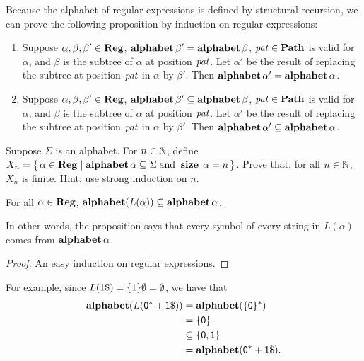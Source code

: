 Because the alphabet of regular expressions is defined by structural
recursion, we can prove the following proposition by induction
on regular expressions:
\begin{proposition}
\label{RegAlphabetSubtreeSubstitute}
\begin{enumerate}[\quad(1)]
\item Suppose $\alpha,\beta,\beta'\in\mathbf{Reg}$,
  $\mathbf{alphabet}\,\beta' = \mathbf{alphabet}\,\beta$, ${\it pat}\in\mathbf{Path}$ is valid for
  $\alpha$, and $\beta$ is the subtree of $\alpha$ at position ${\it pat}$.
  Let $\alpha'$ be the result of replacing the subtree at position
  ${\it pat}$ in $\alpha$ by $\beta'$. Then
  $\mathbf{alphabet}\,\alpha' = \mathbf{alphabet}\,\alpha$.

\item Suppose $\alpha,\beta,\beta'\in\mathbf{Reg}$,
  $\mathbf{alphabet}\,\beta' \subseteq \mathbf{alphabet}\,\beta$, ${\it pat}\in\mathbf{Path}$ is valid for
  $\alpha$, and $\beta$ is the subtree of $\alpha$ at position ${\it pat}$.
  Let $\alpha'$ be the result of replacing the subtree at position
  ${\it pat}$ in $\alpha$ by $\beta'$. Then
  $\mathbf{alphabet}\,\alpha' \subseteq \mathbf{alphabet}\,\alpha$.
\end{enumerate}
\end{proposition}

\begin{exercise}
\label{RegExactExpOverAlphabetFinite}
Suppose $\Sigma$ is an alphabet.
For $n\in\mathbb{N}$, define
$X_n = \{ \, \alpha\in\mathbf{Reg} \mid \mathbf{alphabet}\,\alpha\subseteq\Sigma
  \;\allowbreak\mbox{and}\allowbreak\; \mathrel{\mathbf{size}}\,\alpha = n \, \}$. Prove that, for all
$n\in\mathbb{N}$, $X_n$ is finite. Hint: use strong induction
on $n$.
\end{exercise}

\begin{proposition}
\label{AlphabetRegMeaning}
For all $\alpha\in\mathbf{Reg}$, $\mathbf{alphabet}(L(\alpha))\subseteq\mathbf{alphabet}\,\alpha$.
\end{proposition}

In other words, the proposition says that every symbol of every string in
$L(\alpha)$  comes from $\mathbf{alphabet}\,\alpha$.

\begin{proof}
An easy induction on regular expressions.
\end{proof}

For example, since $L(\mathsf{1}\$) = \{\mathsf{1}\}\emptyset = \emptyset$,
we have that
\begin{align*}
\mathbf{alphabet}(L(\mathsf{0^*+1\$})) &=
\mathbf{alphabet}(\{\mathsf{0}\}^*) \\
&= \{\mathsf{0}\} \\
&\subseteq \{\mathsf{0,1}\} \\
&= \mathbf{alphabet}(\mathsf{0^*+1\$}) .
\end{align*}

